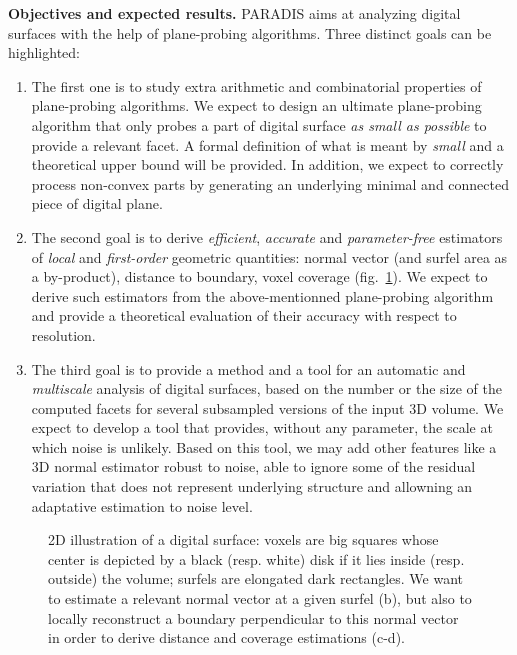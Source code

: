 \noindent\textbf{Objectives and expected results.}
PARADIS aims at analyzing digital surfaces with the help of plane-probing algorithms. 
Three distinct goals can be highlighted:
\begin{enumerate}[label=(G\arabic*)]
  \item %
The first one is to study extra arithmetic and combinatorial properties
of plane-probing algorithms. We expect to design an ultimate plane-probing algorithm that
only probes a part of digital surface \emph{as small as possible} to provide a relevant facet.
A formal definition of what is meant by \emph{small} and a theoretical upper bound will be provided.
In addition, we expect to correctly process non-convex parts by generating an underlying
minimal and connected piece of digital plane.  \label{goalppa} 
 \item %
The second goal is to derive \emph{efficient}, \emph{accurate} and \emph{parameter-free} estimators
of \emph{local} and \emph{first-order} geometric quantities: normal vector (and surfel area as a by-product),
distance to boundary, voxel coverage (fig.~\ref{fig:2D}). We expect to derive such estimators from
the above-mentionned plane-probing algorithm and provide a theoretical evaluation of their accuracy
with respect to resolution. \label{goalestim}  
 \item %
The third goal is to provide a method and a tool for an automatic and \emph{multiscale} analysis of digital surfaces,
based on the number or the size of the computed facets for several subsampled versions of the input 3D volume. 
We expect to develop a tool that provides, without any parameter, the scale at which noise is unlikely. Based on
this tool, we may add other features like a 3D normal estimator robust to noise, \ie able to ignore some of
the residual variation that does not represent underlying structure and allowning an adaptative estimation to noise level.  \label{goalscale}
\end{enumerate}

\begin{figure}[hbt]
  \centering
{} \hspace{0.05\textwidth}
 \hspace{0.05\textwidth}
 \hspace{0.05\textwidth}
 \caption{2D illustration of a digital surface: voxels are big squares whose center is depicted by a black (resp. white) disk if it lies inside (resp. outside) the volume; surfels are elongated dark rectangles. We want to estimate a relevant normal vector at a given surfel (b), but also to locally reconstruct a boundary perpendicular to this normal vector in order to derive distance and coverage estimations (c-d).} 
\label{fig:2D} 
\end{figure}


